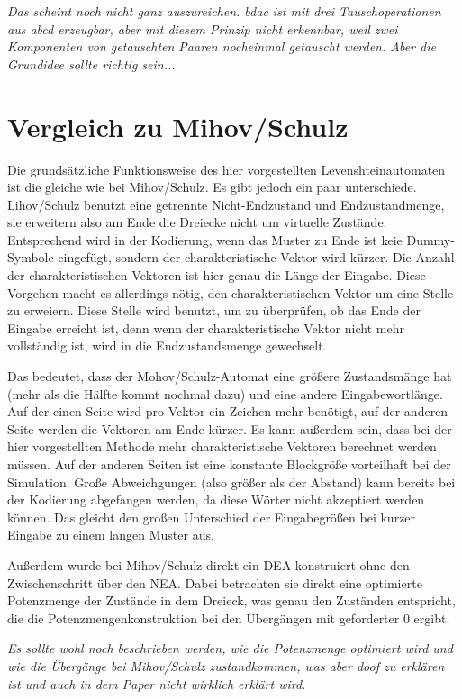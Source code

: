 \textit{Das scheint noch nicht ganz auszureichen. bdac ist mit drei Tauschoperationen aus abcd erzeugbar, aber mit diesem Prinzip nicht erkennbar, weil zwei Komponenten von getauschten Paaren nocheinmal getauscht werden. Aber die Grundidee sollte richtig sein...}
\section{Vergleich zu Mihov/Schulz}
Die grundsätzliche Funktionsweise des hier vorgestellten Levenshteinautomaten ist die gleiche wie bei Mihov/Schulz. Es gibt jedoch ein paar unterschiede. Lihov/Schulz benutzt eine getrennte Nicht-Endzustand und Endzustandmenge, sie erweitern also am Ende die Dreiecke nicht um virtuelle Zustände. Entsprechend wird in der Kodierung, wenn das Muster zu Ende ist keie Dummy-Symbole eingefügt, sondern der charakteristische Vektor wird kürzer. Die Anzahl der charakteristischen Vektoren ist hier genau die Länge der Eingabe. Diese Vorgehen macht es allerdings nötig, den charakteristischen Vektor um eine Stelle zu erweiern. Diese Stelle wird benutzt, um zu überprüfen, ob das Ende der Eingabe erreicht ist, denn wenn der charakteristische Vektor nicht mehr vollständig ist, wird in die Endzustandsmenge gewechselt.

Das bedeutet, dass der Mohov/Schulz-Automat eine größere Zustandsmänge hat (mehr als die Hälfte kommt nochmal dazu) und eine andere Eingabewortlänge. Auf der einen Seite wird pro Vektor ein Zeichen mehr benötigt, auf der anderen Seite werden die Vektoren am Ende kürzer. Es kann außerdem sein, dass bei der hier vorgestellten Methode mehr charakteristische Vektoren berechnet werden müssen. Auf der anderen Seiten ist eine konstante Blockgröße vorteilhaft bei der Simulation. Große Abweichgungen (also größer als der Abstand) kann bereits bei der Kodierung abgefangen werden, da diese Wörter nicht akzeptiert werden können. Das gleicht den großen Unterschied der Eingabegrößen bei kurzer Eingabe zu einem langen Muster aus.

Außerdem wurde bei Mihov/Schulz direkt ein DEA konstruiert ohne den Zwischenschritt über den NEA. Dabei betrachten sie direkt eine optimierte Potenzmenge der Zustände in dem Dreieck, was genau den Zuständen entspricht, die die Potenzmengenkonstruktion bei den Übergängen mit geforderter 0 ergibt.

\textit{Es sollte wohl noch beschrieben werden, wie die Potenzmenge optimiert wird und wie die Übergänge bei Mihov/Schulz zustandkommen, was aber doof zu erklären ist und auch in dem Paper nicht wirklich erklärt wird.}
